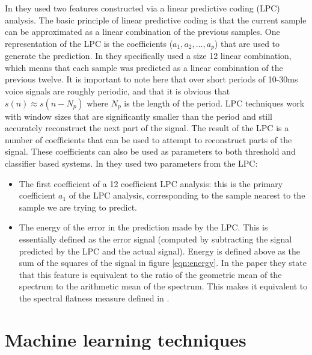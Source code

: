 \documentclass[ %
                    author={Sam Phippen},
                supervisor={Dr. Rafal Bogacz},
                     title={Real time voice activity detectors in noisy personal computing environments},
                  subtitle={},
                    degree={MEng},
                      year={2012} ]{thesis}
\begin{document}
In \cite{atal} they used two features constructed via a linear predictive
coding (LPC) analysis. The basic principle of linear predictive coding is that
the current sample can be approximated as a linear combination of the previous
samples\cite{rabiner}. One representation of the LPC is the coefficients
($a_1,a_2,...,a_p$) that are used to generate the prediction. In \cite{atal}
they specifically used a size 12 linear combination, which means that each
sample was predicted as a linear combination of the previous twelve. It is
important to note here that over short periods of 10-30ms voice signals are
roughly periodic, and that it is obvious that $s(n) \approx s(n-N_p)$ where
$N_p$ is the length of the period. LPC techniques work with window sizes that
are significantly smaller than the period and still accurately reconstruct the
next part of the signal. The result of the LPC is a number of coefficients that
can be used to attempt to reconstruct parts of the signal. These coefficients can
also be used as parameters to both threshold and classifier based systems. In
\cite{atal} they used two parameters from the LPC:

\begin{itemize}

    \item The first coefficient of a 12 coefficient LPC analysis: this is the
        primary coefficient $a_1$ of the LPC analysis, corresponding to the
        sample nearest to the sample we are trying to predict.

    \item The energy of the error in the prediction made by the LPC. This is
        essentially defined as the error signal (computed by subtracting the
        signal predicted by the LPC and the actual signal). Energy is defined
        above as the sum of the squares of the signal in figure
        \ref{eqn:energy}. In the paper they state that this feature is
        equivalent to the ratio of the geometric mean of the spectrum to the
        arithmetic mean of the spectrum. This makes it equivalent to the
        spectral flatness measure defined in \cite{moattar}.

\end{itemize}


\section{Machine learning techniques}
\end{document}
